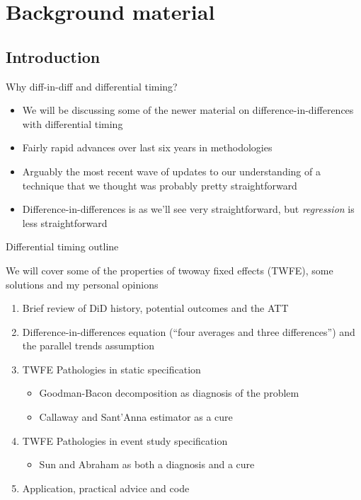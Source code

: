 \documentclass{beamer}
\begin{document}



\section{Background material}
\subsection{Introduction}



\begin{frame}{Why diff-in-diff and differential timing?}

\begin{itemize}
\item We will be discussing some of the newer material on difference-in-differences with differential timing
\item Fairly rapid advances over last six years in methodologies
\item Arguably the most recent wave of updates to our understanding of a technique that we thought was probably pretty straightforward
\item Difference-in-differences is as we'll see very straightforward, but \emph{regression} is less straightforward
\end{itemize}

\end{frame}

\begin{frame}{Differential timing outline}

We will cover some of the properties of twoway fixed effects (TWFE), some solutions and my personal opinions

\bigskip

\begin{enumerate}
	\item Brief review of DiD history, potential outcomes and the ATT
	\item Difference-in-differences equation (``four averages and three differences'') and the parallel trends assumption
	\item TWFE Pathologies in static specification
		\begin{itemize}
		\item Goodman-Bacon decomposition as diagnosis of the problem
		\item Callaway and Sant'Anna estimator as a cure
		\end{itemize}
	\item TWFE Pathologies in event study specification
		\begin{itemize}
		\item Sun and Abraham as both a diagnosis and a cure 
		\end{itemize}
	\item Application, practical advice and code
\end{enumerate}

\end{frame}	
\end{document}

